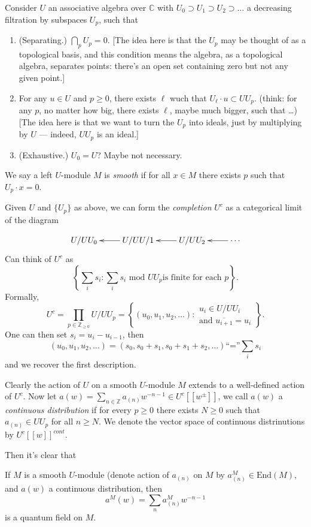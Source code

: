 Consider $U$ an associative algebra over
$\mathbb{C}$ with
$U_0 \supset U_1 \supset U_2 \supset\ldots$ a
decreasing
filtration by subspaces $U_p$, such that
\begin{enumerate}
\item
\label{item-separating}
(Separating.) $\bigcap_{p}U_p=0$.
[The idea here is that the $U_p$ may be
thought of
as a topological basis, and this condition
means
the algebra, as a topological algebra,
separates points:
there's an open set containing zero but not
any given point.]

\item
\label{item-l}
For any $u \in U$ and $p\geq 0$, there exists
$\ell$
wuch that  $U_\ell \cdot u \subset U U_p$.
(think: for any $p$, no matter how big,
there exists $\ell$, maybe much bigger, such
that  …)
[The idea here is that we want to turn the
$U_p$ into ideals,
just by multiplying by $U$ --- indeed, $U
U_p$ is an ideal.]

\item (Exhaustive.) $U_0= U$? Maybe not
necessary.
\label{item-exhaustive}
\end{enumerate}

\noindent
We say a left $U$-module $M$ is {\it smooth}
if
for all $x \in M$ there exists $p$ such that
$U_p\cdot x=0$.

\medskip\noindent
Given $U$ and $\{U_p\}$ as above, we can form
the {\it completion} $U^c$
as a categorical limit of the diagram

$$
\xymatrix{
U/U U_0&U/U U/1 \ar[l]& U/ U U_2 \ar[l]&
\cdots \ar[l].
}
$$
Can think of $U^c$ as
$$
\left\{\sum_is_i:\sum_is_i\text{ mod }U U_p
\text{is finite for each $p$}\right\}.
$$
Formally,
$$
U^c=\prod_{p \in \mathbb{Z}_{\geq 0}}U/U U_p
=\left\{(u_0,u_1,u_2,\ldots):\substack{u_i
\in U/U U_i \\
\text{and }\overline{u_{i+1}}=u_i}\right\}.
$$
One can then set $s_i=u_i-u_{i-1}$, then
$$
(u_0,u_1,u_2,\ldots)=(s_0,s_0+s_1,s_0+s_1+
s_2,\ldots)
\text{``=''}\sum_is_i
$$
and we recover the first description.

Clearly the action of $U$ on a smooth
$U$-module $M$
extends to a well-defined action of $U^c$.
Now let $a(w)=\sum_{n \in
\mathbb{Z}}a_{(n)}w^{-n-1}
\in U^c[[w^{\pm}]]$,
we call $a(w)$ a {\it continuous
distribution} if
for every $p \geq 0$ there exists $N \geq 0$
such that
$a_{(n)}\in U U_p$ for all $n \geq N$.
We denote the vector space of continuous
distrinutions by
$U^c[[w]]^{cont}$.

Then it's clear that
\begin{lemma}
\label{lemma-conti-distr-quant}
If $M$ is a smooth $U$-module
(denote action of $a_{(n)}$ on $M$ by
$a^M_{(n)}\in \text{End}(M)$,
and $a(w)$ a continuous distribution, then
$$
a^M(w)=\sum_n a_{(n)}^Mw^{-n-1}
$$
is a quantum field on $M$.
\end{lemma}

